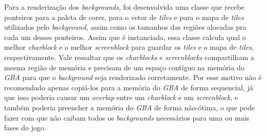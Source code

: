 Para a renderização dos \textit{backgrounds}, foi desenvolvida uma classe que recebe ponteiros para a paleta de cores,  para o vetor de \textit{tiles} e para o mapa de \textit{tiles} utilizados pelo \textit{background}, assim como os tamanhos das regiões alocadas pra cada um desses ponteiros. Assim que é instanciada, essa classe calcula qual o melhor \textit{charblock} e o melhor \textit{screenblock} para guardar os \textit{tiles} e o mapa de \textit{tiles}, respectivamente. Vale ressaltar que os \textit{charblocks} e \textit{screenblocks} compartilham a mesma região de memória e precisam de um espaço contíguo na memória do \textit{GBA} para que o \textit{background} seja renderizado corretamente. Por esse motivo não é recomendado apenas copiá-los para a memória do \textit{GBA} de forma sequencial, já que isso poderia causar um \textit{overlap} entre um \textit{charblock} e um \textit{screenblock}, e também poderia preencher a memória do \textit{GBA} de forma não-ótima, o que pode fazer com que não caibam todos os \textit{backgrounds} necessários para uma ou mais fases do jogo.